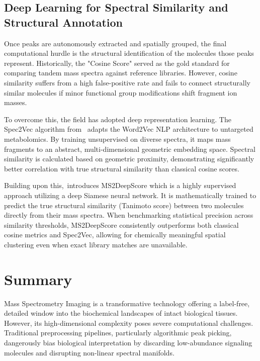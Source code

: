 \documentclass[
12pt, %
oneside, %
english, %
onehalfspacing, %
nolistspacing, %
headsepline, %
]{MastersDoctoralThesis} %
\begin{document}
\subsection{Deep Learning for Spectral Similarity and Structural Annotation}

Once peaks are autonomously extracted and spatially grouped, the final computational hurdle is the structural identification of the molecules those peaks represent. Historically, the "Cosine Score" served as the gold standard for comparing tandem mass spectra against reference libraries. However, cosine similarity suffers from a high false-positive rate and fails to connect structurally similar molecules if minor functional group modifications shift fragment ion masses.

To overcome this, the field has adopted deep representation learning. The Spec2Vec algorithm from~\citet{huber2021spec2vec} adapts the Word2Vec NLP architecture to untargeted metabolomics. By training unsupervised on diverse spectra, it maps mass fragments to an abstract, multi-dimensional geometric embedding space. Spectral similarity is calculated based on geometric proximity, demonstrating significantly better correlation with true structural similarity than classical cosine scores.

Building upon this,~\citet{huber2021ms2deepscore}introduces MS2DeepScore which is a highly supervised approach utilizing a deep Siamese neural network. It is mathematically trained to predict the true structural similarity (Tanimoto score) between two molecules directly from their mass spectra. When benchmarking statistical precision across similarity thresholds, MS2DeepScore consistently outperforms both classical cosine metrics and Spec2Vec, allowing for chemically meaningful spatial clustering even when exact library matches are unavailable.

\section{Summary}

Mass Spectrometry Imaging is a transformative technology offering a label-free, detailed window into the biochemical landscapes of intact biological tissues. However, its high-dimensional complexity poses severe computational challenges. Traditional preprocessing pipelines, particularly algorithmic peak picking, dangerously bias biological interpretation by discarding low-abundance signaling molecules and disrupting non-linear spectral manifolds.
\end{document}
